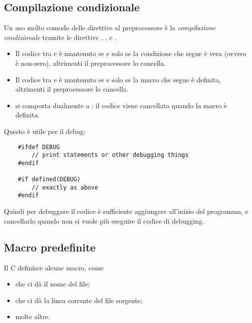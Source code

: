 \subsection*{Compilazione condizionale}

Un uso molto comodo delle direttive al preprocessore è la \emph{compilazione condizionale} tramite le direttive , ,  e .

\begin{itemize}
    \item Il codice tra  e  è mantenuto se e solo se la condizione che segue  è vera (ovvero è non-zero), altrimenti il preprocessore lo cancella.
    \item Il codice tra  e  è mantenuto se e solo se la macro che segue  è definita, altrimenti il preprocessore lo cancella.
    \item {} si comporta dualmente a : il codice viene cancellato quando la macro è definita. 
\end{itemize}

Questo è utile per il debug:
\begin{verbatim}
    #ifdef DEBUG
        // print statements or other debugging things
    #endif

    #if defined(DEBUG)
        // exactly as above
    #endif
\end{verbatim}
Quindi per debuggare il codice è sufficiente aggiungere  all'inizio del programma, e cancellarlo quando non si vuole più eseguire il codice di debugging.

\subsection*{Macro predefinite}

Il C definisce alcune macro, come \begin{itemize}
    \item {} che ci dà il nome del file;
    \item {} che ci dà la linea corrente del file sorgente;
    \item molte altre.
\end{itemize}